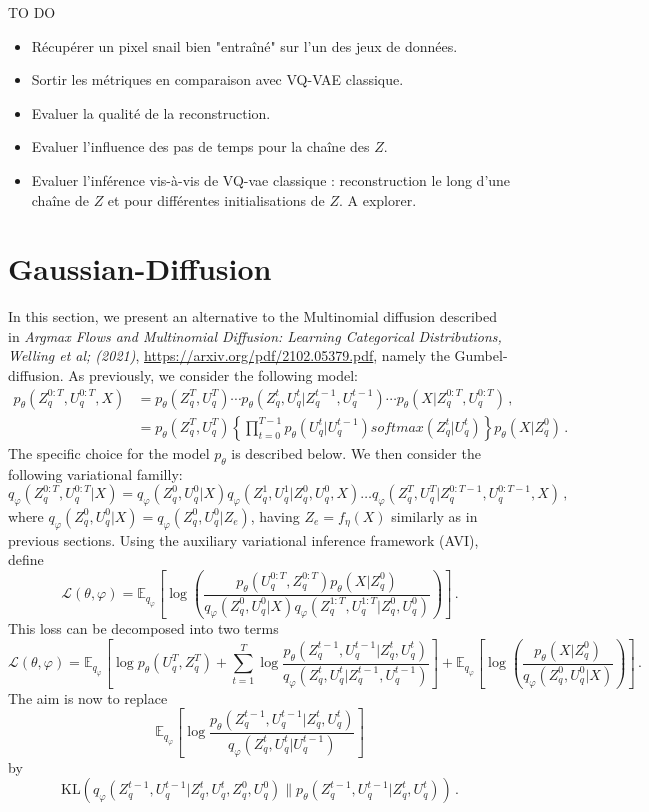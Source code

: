 \documentclass{article}
\begin{document}
TO DO

\begin{itemize}
\item Récupérer un pixel snail bien "entraîné" sur l'un des jeux de données.
\item Sortir les métriques en comparaison avec VQ-VAE classique.
\item Evaluer la qualité de la reconstruction.
\item Evaluer l'influence des pas de temps pour la chaîne des $Z$.
\item Evaluer l'inférence vis-à-vis de VQ-vae classique : reconstruction le long d'une chaîne de $Z$ et pour différentes initialisations de $Z$. A explorer.
\end{itemize}



\clearpage
\newpage

\section{Gaussian-Diffusion}
In this section, we present an alternative to the Multinomial diffusion described in {\em Argmax Flows and Multinomial Diffusion: Learning Categorical Distributions, Welling et al; (2021)}, \url{https://arxiv.org/pdf/2102.05379.pdf}, namely the Gumbel-diffusion.  As previously, we consider the following model:
\begin{align*}
p_{\theta}(Z_q^{0:T},U_q^{0:T}, X) &= p_{\theta}(Z_q^T,U_q^T) \cdots p_{\theta}(Z_q^t,U_q^t|Z_q^{t-1},U_q^{t-1}) \cdots p_{\theta}(X|Z^{0:T}_q,U_q^{0:T})\,,\\
&= p_{\theta}(Z_q^T,U_q^T) \left\{\prod_{t=0}^{T-1}p_{\theta}(U_q^t|U_q^{t-1})softmax(Z_q^t|U_q^t)\right\}p_{\theta}(X|Z^{0}_q)\,.
\end{align*}
The specific choice for the model $p_\theta$ is described below. We then consider the following variational familly:
$$
q_{\varphi}(Z_q^{0:T},U_q^{0:T}| X) = q_{\varphi}(Z_q^0,U_q^0 | X) q_{\varphi}(Z_q^1,U_q^1 | Z_q^0, U_q^0,X) \ldots  q_{\varphi}(Z_q^T,U_q^T | Z_q^{0:T-1}, U_q^{0:T-1}, X)\,,
$$
where $q_{\varphi}(Z_q^0,U_q^0 | X) = q_{\varphi}(Z_q^0,U_q^0 | Z_e)$, having $Z_e = f_\eta(X)$ similarly as in  previous sections. Using the auxiliary variational inference framework (AVI), define
$$
\mathcal{L}(\theta, \varphi) = \mathbb{E}_{q_\varphi} \left[ \log\left(\frac{p_\theta(U_q^{0:T},Z_q^{0:T})p_\theta(X|Z_q^0)}{q_\varphi(Z_q^0,U_q^0|X) q_\varphi(Z_q^{1:T},U_q^{1:T}|Z_q^0,U_q^0)}\right) \right]\,.
$$
This loss can be decomposed into two terms
$$
\mathcal{L}(\theta, \varphi) = \mathbb{E}_{q_\varphi} \left[\log p_\theta(U_q^T,Z_q^T) + \sum_{t=1}^T\log  \frac{p_\theta(Z_q^{t-1},U_q^{t-1}|Z_q^t,U_q^t)}{q_\varphi(Z_q^{t},U_q^t|Z_q^{t-1},U_q^{t-1})} \right] + \mathbb{E}_{q_\varphi} \left[ \log\left(\frac{p_\theta(X|Z_q^0)}{q_\varphi(Z_q^0,U_q^0|X)}\right) \right]\,.
$$
The aim is now to replace
$$
 \mathbb{E}_{q_\varphi} \left[\log  \frac{p_\theta(Z_q^{t-1},U_q^{t-1}|Z_q^t,U_q^t)}{q_\varphi(Z_q^{t},U_q^t|U_q^{t-1})} \right]
$$
by
$$
\mathrm{KL}(q_\varphi(Z_q^{t-1},U_q^{t-1}|Z_q^t,U_q^{t},Z_q^0,U_q^{0})\|p_\theta(Z_q^{t-1},U_q^{t-1}|Z_q^t,U_q^t))\,.
$$
\end{document}
